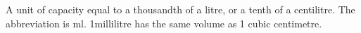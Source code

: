 A unit of capacity equal to a thousandth of a litre, or a tenth of
a centilitre. The abbreviation is ml.
1millilitre has the same volume as 1 cubic centimetre.